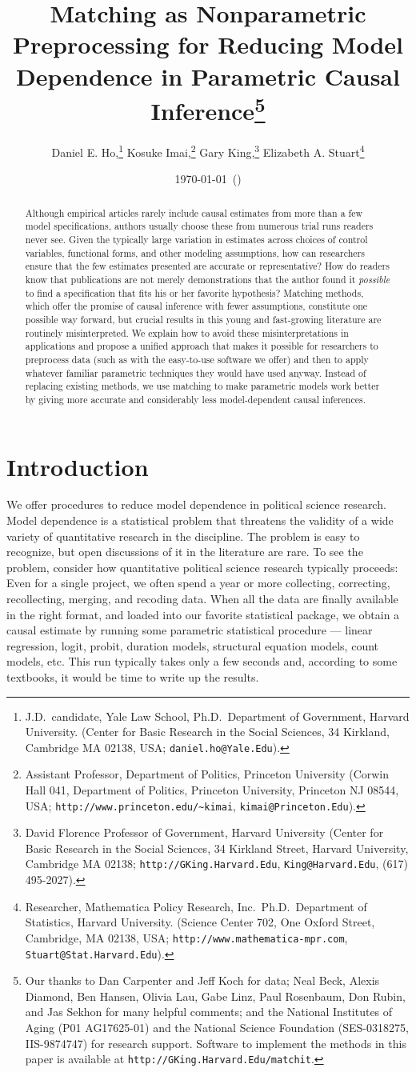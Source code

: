 \documentclass[11pt,titlepage]{article}
\title{Matching as Nonparametric Preprocessing for Reducing Model
  Dependence in Parametric Causal Inference\thanks{Our thanks to Dan
    Carpenter and Jeff Koch for data; Neal Beck, Alexis Diamond, Ben
    Hansen, Olivia Lau, Gabe Linz, Paul Rosenbaum, Don Rubin, and Jas
    Sekhon for many helpful comments; and the National Institutes of
    Aging (P01 AG17625-01) and the National Science Foundation
    (SES-0318275, IIS-9874747) for research support.  Software to
    implement the methods in this paper is available at
    \texttt{http://GKing.Harvard.Edu/matchit}.}}
\author{Daniel E. Ho,\thanks{J.D.\ candidate, Yale Law School, Ph.D.\,
    Department of Government, Harvard University. (Center for Basic
    Research in the Social Sciences, 34 Kirkland, Cambridge MA 02138,
    USA; \texttt{daniel.ho@Yale.Edu}).}
Kosuke Imai,\thanks{Assistant Professor, Department of Politics, Princeton
    University (Corwin Hall 041, Department of Politics, Princeton
    University, Princeton NJ 08544, USA;
    \texttt{http://www.princeton.edu/\~{}kimai},
    \texttt{kimai@Princeton.Edu}).}
Gary King,\thanks{David Florence Professor of Government, Harvard
  University (Center for Basic Research in the Social Sciences, 34
  Kirkland Street, Harvard University, Cambridge MA 02138;
  \texttt{http://GKing.Harvard.Edu}, \texttt{King@Harvard.Edu}, (617)
  495-2027).}
Elizabeth A. Stuart\thanks{Researcher, Mathematica Policy Research, Inc.\, Ph.D.\, Department of Statistics,
  Harvard University. (Science Center 702, One Oxford Street,
  Cambridge, MA 02138, USA;
  \texttt{http://www.mathematica-mpr.com},
  \texttt{Stuart@Stat.Harvard.Edu}).}}
\date{\today\ (\printtime)}
\begin{document}
\maketitle

\begin{abstract}
  Although empirical articles rarely include causal estimates from
  more than a few model specifications, authors usually choose these
  from numerous trial runs readers never see.  Given the typically
  large variation in estimates across choices of control variables,
  functional forms, and other modeling assumptions, how can
  researchers ensure that the few estimates presented are accurate or
  representative?  How do readers know that publications are not
  merely demonstrations that the author found it \emph{possible} to
  find a specification that fits his or her favorite hypothesis?
  Matching methods, which offer the promise of causal inference with
  fewer assumptions, constitute one possible way forward, but crucial
  results in this young and fast-growing literature are routinely
  misinterpreted.  We explain how to avoid these misinterpretations in
  applications and propose a unified approach that makes it possible
  for researchers to preprocess data (such as with the easy-to-use
  software we offer) and then to apply whatever familiar parametric
  techniques they would have used anyway.  Instead of replacing
  existing methods, we use matching to make parametric models work
  better by giving more accurate and considerably less model-dependent
  causal inferences.
\end{abstract}

\section{Introduction}

We offer procedures to reduce model dependence in political science
research.  Model dependence is a statistical problem that threatens
the validity of a wide variety of quantitative research in the
discipline.  The problem is easy to recognize, but open discussions of
it in the literature are rare.  To see the problem, consider how
quantitative political science research typically proceeds: Even for a
single project, we often spend a year or more collecting, correcting,
recollecting, merging, and recoding data.  When all the data are
finally available in the right format, and loaded into our favorite
statistical package, we obtain a causal estimate by running some
parametric statistical procedure --- linear regression, logit, probit,
duration models, structural equation models, count models, etc.  This
run typically takes only a few seconds and, according to some
textbooks, it would be time to write up the results.
\end{document}
